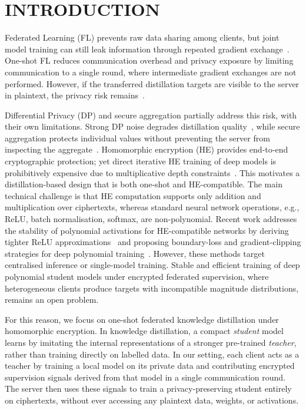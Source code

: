 \section{INTRODUCTION}
\label{sec:introduction}

Federated Learning (FL) prevents raw data sharing among clients, but joint model training can still leak information through repeated gradient exchange~\cite{zhu2019deep, so2023securing}. One-shot FL reduces communication overhead and privacy exposure by limiting communication to a single round, where intermediate gradient exchanges are not performed. However, if the transferred distillation targets are visible to the server in plaintext, the privacy risk remains~\cite{jagielski2023students}.

Differential Privacy (DP) and secure aggregation partially address this risk, with their own limitations. Strong DP noise degrades distillation quality~\cite{shao2023selective}, while secure aggregation protects individual values without preventing the server from inspecting the aggregate~\cite{kerkouche2023client}. Homomorphic encryption (HE) provides end-to-end cryptographic protection; yet direct iterative HE training of deep models is prohibitively expensive due to multiplicative depth constraints~\cite{zhang2020batchcrypt, jin2023fedml, kanpak2024cure}. This motivates a distillation-based design that is both one-shot and HE-compatible. The main technical challenge is that HE computation supports only addition and multiplication over ciphertexts, whereas standard neural network operations, e.g., ReLU, batch normalisation, softmax, are non-polynomial. Recent work addresses the stability of polynomial activations for HE-compatible networks by deriving tighter ReLU approximations~\cite{agamennone2025polynomial} and proposing boundary-loss and gradient-clipping strategies for deep polynomial training~\cite{alhossain2025training}. However, these methods target centralised inference or single-model training. Stable and efficient training of deep polynomial student models under encrypted federated supervision, where heterogeneous clients produce targets with incompatible magnitude distributions, remains an open problem.



For this reason, we focus on one-shot federated knowledge distillation under homomorphic encryption. In knowledge distillation, a compact \emph{student} model learns by imitating the internal representations of a stronger pre-trained \emph{teacher}, rather than training directly on labelled data. In our setting, each client acts as a teacher by training a local model on its private data and contributing encrypted supervision signals derived from that model in a single communication round. The server then uses these signals to train a privacy-preserving student entirely on ciphertexts, without ever accessing any plaintext data, weights, or activations.

